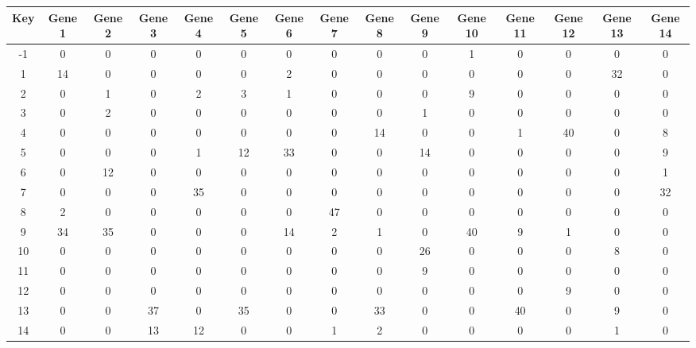 \begin{tabular}{|c|c|c|c|c|c|c|c|c|c|c|c|c|c|c|}
\hline
Key & Gene 1 & Gene 2 & Gene 3 & Gene 4 & Gene 5 & Gene 6 & Gene 7 & Gene 8 & Gene 9 & Gene 10 & Gene 11 & Gene 12 & Gene 13 & Gene 14 \\
\hline
-1 & 0 & 0 & 0 & 0 & 0 & 0 & 0 & 0 & 0 & 1 & 0 & 0 & 0 & 0 \\
1 & 14 & 0 & 0 & 0 & 0 & 2 & 0 & 0 & 0 & 0 & 0 & 0 & 32 & 0 \\
2 & 0 & 1 & 0 & 2 & 3 & 1 & 0 & 0 & 0 & 9 & 0 & 0 & 0 & 0 \\
3 & 0 & 2 & 0 & 0 & 0 & 0 & 0 & 0 & 1 & 0 & 0 & 0 & 0 & 0 \\
4 & 0 & 0 & 0 & 0 & 0 & 0 & 0 & 14 & 0 & 0 & 1 & 40 & 0 & 8 \\
5 & 0 & 0 & 0 & 1 & 12 & 33 & 0 & 0 & 14 & 0 & 0 & 0 & 0 & 9 \\
6 & 0 & 12 & 0 & 0 & 0 & 0 & 0 & 0 & 0 & 0 & 0 & 0 & 0 & 1 \\
7 & 0 & 0 & 0 & 35 & 0 & 0 & 0 & 0 & 0 & 0 & 0 & 0 & 0 & 32 \\
8 & 2 & 0 & 0 & 0 & 0 & 0 & 47 & 0 & 0 & 0 & 0 & 0 & 0 & 0 \\
9 & 34 & 35 & 0 & 0 & 0 & 14 & 2 & 1 & 0 & 40 & 9 & 1 & 0 & 0 \\
10 & 0 & 0 & 0 & 0 & 0 & 0 & 0 & 0 & 26 & 0 & 0 & 0 & 8 & 0 \\
11 & 0 & 0 & 0 & 0 & 0 & 0 & 0 & 0 & 9 & 0 & 0 & 0 & 0 & 0 \\
12 & 0 & 0 & 0 & 0 & 0 & 0 & 0 & 0 & 0 & 0 & 0 & 9 & 0 & 0 \\
13 & 0 & 0 & 37 & 0 & 35 & 0 & 0 & 33 & 0 & 0 & 40 & 0 & 9 & 0 \\
14 & 0 & 0 & 13 & 12 & 0 & 0 & 1 & 2 & 0 & 0 & 0 & 0 & 1 & 0 \\
\hline
\end{tabular}